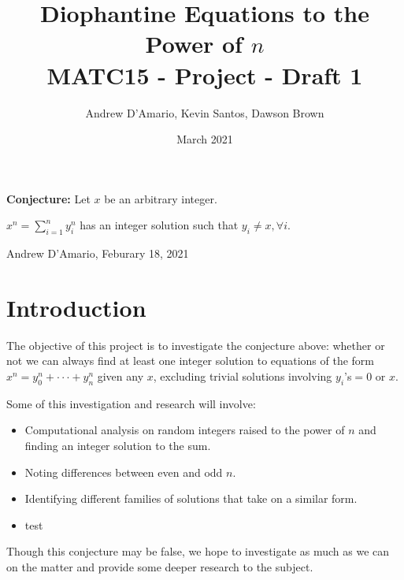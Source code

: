 \documentclass{article}
\title{Diophantine Equations to the Power of $n$ \\ \vspace{.3in} \large{MATC15 - Project - Draft 1}}
\author{Andrew D'Amario, Kevin Santos, Dawson Brown }
\date{March 2021}
\begin{document}
\maketitle

\begin{flushleft}
    {\bf Conjecture:} Let $x$ be an arbitrary integer.

    \hspace{.5in}$\displaystyle x^n=\sum^{n}_{i=1}y_i^n$ has an integer solution such that $y_i\ne x, \forall i$.

    \hspace{2in} Andrew D'Amario, Feburary 18, 2021
\end{flushleft}

\section{Introduction}
The objective of this project is to investigate the conjecture above: whether or not we can always find at least one integer solution to equations of the form $x^n=y_0^n+\cdot\cdot\cdot+y_n^n$ given any $x$, excluding trivial solutions involving $y_i$'s$=0$ or $x$. 

Some of this investigation and research will involve:
\begin{itemize}
    \item Computational analysis on random integers raised to the power of $n$ and finding an integer solution to the sum.
    \item Noting differences between even and odd $n$.
    \item Identifying different families of solutions that take on a similar form.
    \item test
\end{itemize}

Though this conjecture may be false, we hope to investigate as much as we can on the matter and provide some deeper research to the subject.



\end{document}
